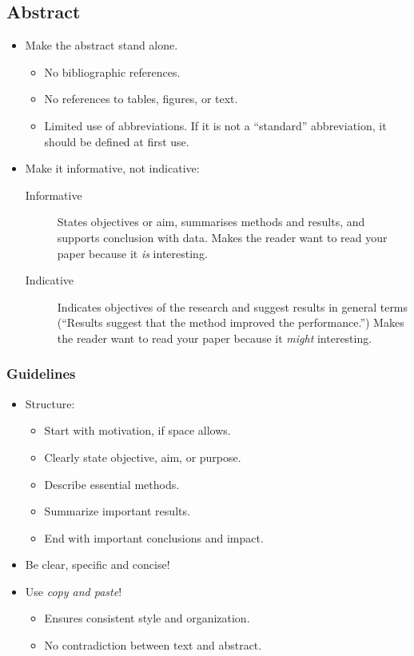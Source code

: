 \documentclass[10pt,a4paper,twocolumn]{scrartcl}
\begin{document}
\subsection{Abstract}
\begin{itemize}
    \item Make the abstract stand alone.
        \begin{itemize}
            \item No bibliographic references.
            \item No references to tables, figures, or text.
            \item Limited use of abbreviations. If it is not a ``standard'' abbreviation, it should be defined at first use.
        \end{itemize}
        
    \item Make it informative, not indicative:
        \begin{description}
            \item[Informative] States objectives or aim, summarises methods and results, and supports conclusion with data. Makes the reader want to read your paper because it \emph{is} interesting.
            \item[Indicative] Indicates objectives of the research and suggest results in general terms (``Results suggest that the method improved the performance.'') Makes the reader want to read your paper because it \emph{might} interesting.
        \end{description}
\end{itemize}

\subsubsection*{Guidelines}
\begin{itemize}
    \item Structure:
        \begin{itemize}
            \item Start with motivation, if space allows.
            \item Clearly state objective, aim, or purpose.
            \item Describe essential methods.
            \item Summarize important results.
            \item End with important conclusions and impact.
        \end{itemize}

    \item Be clear, specific and concise!
    \item Use \emph{copy and paste}!
        \begin{itemize}
            \item Ensures consistent style and organization.
            \item No contradiction between text and abstract.
        \end{itemize}
        
\end{itemize}
\end{document}

